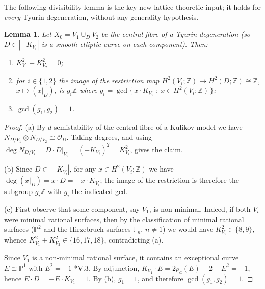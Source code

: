\documentclass[11pt]{amsart}
\theoremstyle{plain}
\newtheorem{lemma}[theorem]{Lemma}
\theoremstyle{definition}
\newcommand{\Z}{\mathbb{Z}}
\newcommand{\OO}{\mathcal{O}}
\begin{document}
The following divisibility lemma is the key new lattice-theoretic input; it
holds for \emph{every} Tyurin degeneration, without any generality hypothesis.

\begin{lemma}\label{lem:divisibility}
Let $X_0=V_1\cup_D V_2$ be the central fibre of a Tyurin degeneration
(so $D\in|-K_{V_i}|$ is a smooth elliptic curve on each component). Then:
\begin{enumerate}
  \item[(a)] $K_{V_1}^2+K_{V_2}^2=0$;
  \item[(b)] for $i\in\{1,2\}$ the image of the restriction map
  $H^2(V_i;\Z)\to H^2(D;\Z)\cong\Z$, $x\mapsto (x|_D)$, is
  $g_i\Z$ where
  $g_i=\gcd\{\,x\cdot K_{V_i}\;:\;x\in H^2(V_i;\Z)\,\}$;
  \item[(c)] $\gcd(g_1,g_2)=1$.
\end{enumerate}
\end{lemma}

\begin{proof}
(a) By $d$-semistability of the central fibre of a Kulikov model
\cite{Fri83,Kul77,PP81} we have
$N_{D/V_1}\otimes N_{D/V_2}\cong\OO_D$. Taking degrees, and using
$\deg N_{D/V_i}=D\cdot D|_{V_i}=(-K_{V_i})^2=K_{V_i}^2$, gives the claim.

(b) Since $D\in|-K_{V_i}|$, for any $x\in H^2(V_i;\Z)$ we have
$\deg(x|_D)=x\cdot D=-x\cdot K_{V_i}$; the image of the restriction is
therefore the subgroup $g_i\Z$ with $g_i$ the indicated gcd.

(c) First observe that some component, say $V_1$, is non-minimal. Indeed, if
both $V_i$ were minimal rational surfaces, then by the classification of
minimal rational surfaces ($\mathbb{P}^2$ and the Hirzebruch surfaces
$\mathbb{F}_n$, $n\neq 1$) we would have $K_{V_i}^2\in\{8,9\}$, whence
$K_{V_1}^2+K_{V_2}^2\in\{16,17,18\}$, contradicting (a).

Since $V_1$ is a non-minimal rational surface, it contains an exceptional curve
$E\cong\mathbb{P}^1$ with $E^2=-1$ \cite{Har77}*{V.3}. By adjunction,
$K_{V_1}\cdot E=2p_a(E)-2-E^2=-1$, hence $E\cdot D=-E\cdot K_{V_1}=1$. By (b),
$g_1=1$, and therefore $\gcd(g_1,g_2)=1$.
\end{proof}
\end{document}
